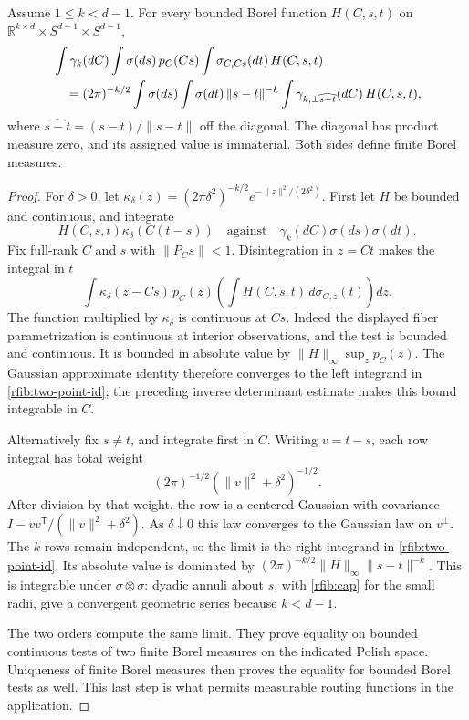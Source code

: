 \begin{lemma}\label{rfib:two-point}
Assume \(1\le k<d-1\).  For every bounded Borel function
\(H(C,s,t)\) on
\(\mathbb R^{k\times d}\times S^{d-1}\times S^{d-1}\),
\begin{align}
 &\int \gamma_k(dC)\int\sigma(ds)\,p_C(Cs)
       \int\sigma_{C,Cs}(dt)\,H(C,s,t) \notag\\
 &\quad=(2\pi)^{-k/2}\int\sigma(ds)\int\sigma(dt)\,
       \|s-t\|^{-k}
       \int\gamma_{k,\perp\widehat{s-t}}(dC)\,H(C,s,t),
                                                        \label{rfib:two-point-id}
\end{align}
where \(\widehat{s-t}=(s-t)/\|s-t\|\) off the diagonal.  The diagonal
has product measure zero, and its assigned value is immaterial.
Both sides define finite Borel measures.
\end{lemma}

\begin{proof}
For \(\delta>0\), let
\(\kappa_\delta(z)=(2\pi\delta^2)^{-k/2}
 e^{-\|z\|^2/(2\delta^2)}\).  First let \(H\) be bounded and
continuous, and integrate
\[
 H(C,s,t)\kappa_\delta(C(t-s))
 \quad\text{against}\quad
 \gamma_k(dC)\sigma(ds)\sigma(dt).
\]
Fix full-rank \(C\) and \(s\) with \(\|P_Cs\|<1\).  Disintegration
in \(z=Ct\) makes the integral in \(t\)
\[
 \int\kappa_\delta(z-Cs)\,p_C(z)
       \left(\int H(C,s,t)\,d\sigma_{C,z}(t)\right)dz.
\]
The function multiplied by \(\kappa_\delta\) is continuous at \(Cs\).
Indeed the displayed fiber parametrization is continuous at interior
observations, and the test is bounded and continuous.  It is bounded
in absolute value by \(\|H\|_\infty\sup_zp_C(z)\).  The Gaussian
approximate identity therefore converges to the left integrand in
\eqref{rfib:two-point-id}; the preceding inverse determinant estimate
makes this bound integrable in \(C\).

Alternatively fix \(s\ne t\), and integrate first in \(C\).
Writing \(v=t-s\), each row integral has total weight
\[
 (2\pi)^{-1/2}(\|v\|^2+\delta^2)^{-1/2}.
\]
After division by that weight, the row is a centered Gaussian with
covariance \(I-vv^{\mathsf T}/(\|v\|^2+\delta^2)\).  As
\(\delta\downarrow0\) this law converges to the Gaussian law on
\(v^\perp\).  The \(k\) rows remain independent, so the limit is the
right integrand in \eqref{rfib:two-point-id}.  Its absolute value is
dominated by
\((2\pi)^{-k/2}\|H\|_\infty\|s-t\|^{-k}\).
This is integrable under \(\sigma\otimes\sigma\): dyadic annuli about
\(s\), with \eqref{rfib:cap} for the small radii, give a convergent
geometric series because \(k<d-1\).

The two orders compute the same limit.  They prove equality on bounded
continuous tests of two finite Borel measures on the indicated Polish
space.  Uniqueness of finite Borel measures then proves the equality
for bounded Borel tests as well.  This last step is what permits
measurable routing functions in the application.
\end{proof}

